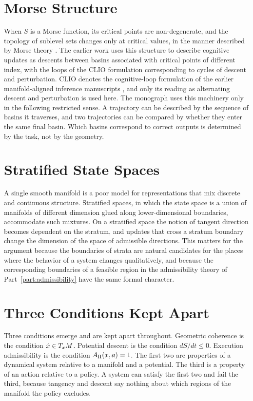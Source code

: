 \section{Morse Structure}

When $S$ is a Morse function, its critical points are non-degenerate, and the topology of sublevel sets changes only at critical values, in the manner described by Morse theory \cite{milnor1963}. The earlier work uses this structure to describe cognitive updates as descents between basins associated with critical points of different index, with the loops of the CLIO formulation corresponding to cycles of descent and perturbation. CLIO denotes the cognitive-loop formulation of the earlier manifold-aligned inference manuscripts \cite{flyxion2025b}, and only its reading as alternating descent and perturbation is used here. The monograph uses this machinery only in the following restricted sense. A trajectory can be described by the sequence of basins it traverses, and two trajectories can be compared by whether they enter the same final basin. Which basins correspond to correct outputs is determined by the task, not by the geometry.

\section{Stratified State Spaces}

A single smooth manifold is a poor model for representations that mix discrete and continuous structure. Stratified spaces, in which the state space is a union of manifolds of different dimension glued along lower-dimensional boundaries, accommodate such mixtures. On a stratified space the notion of tangent direction becomes dependent on the stratum, and updates that cross a stratum boundary change the dimension of the space of admissible directions. This matters for the argument because the boundaries of strata are natural candidates for the places where the behavior of a system changes qualitatively, and because the corresponding boundaries of a feasible region in the admissibility theory of Part~\ref{part:admissibility} have the same formal character.

\section{Three Conditions Kept Apart}

Three conditions emerge and are kept apart throughout. Geometric coherence is the condition $\dot x\in T_xM$. Potential descent is the condition $dS/dt\le0$. Execution admissibility is the condition $A_\Pi(x,a)=1$. The first two are properties of a dynamical system relative to a manifold and a potential. The third is a property of an action relative to a policy. A system can satisfy the first two and fail the third, because tangency and descent say nothing about which regions of the manifold the policy excludes.

